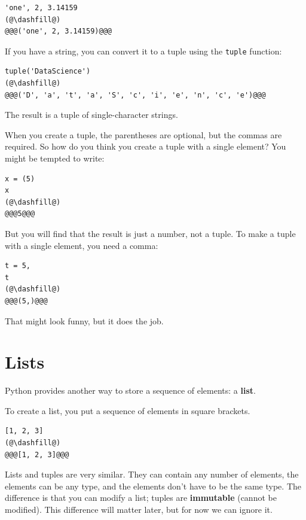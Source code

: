 \begin{lstlisting}[]
'one', 2, 3.14159 
(@\dashfill@)
@@@('one', 2, 3.14159)@@@
\end{lstlisting}

If you have a string, you can convert it to a tuple using the
\passthrough{\lstinline!tuple!} function:

\begin{lstlisting}[]
tuple('DataScience')
(@\dashfill@)
@@@('D', 'a', 't', 'a', 'S', 'c', 'i', 'e', 'n', 'c', 'e')@@@
\end{lstlisting}

The result is a tuple of single-character strings.

When you create a tuple, the parentheses are optional, but the commas
are required. So how do you think you create a tuple with a single
element? You might be tempted to write:

\begin{lstlisting}[]
x = (5)
x
(@\dashfill@)
@@@5@@@
\end{lstlisting}

But you will find that the result is just a number, not a tuple. To make
a tuple with a single element, you need a comma:

\begin{lstlisting}[]
t = 5,
t
(@\dashfill@)
@@@(5,)@@@
\end{lstlisting}

That might look funny, but it does the job.

\hypertarget{lists}{%
\section{Lists}\label{lists}}

Python provides another way to store a sequence of elements: a
\textbf{list}.

To create a list, you put a sequence of elements in square brackets.

\begin{lstlisting}[]
[1, 2, 3]
(@\dashfill@)
@@@[1, 2, 3]@@@
\end{lstlisting}

Lists and tuples are very similar. They can contain any number of
elements, the elements can be any type, and the elements don't have to
be the same type. The difference is that you can modify a list; tuples
are \textbf{immutable} (cannot be modified). This difference will matter
later, but for now we can ignore it.

